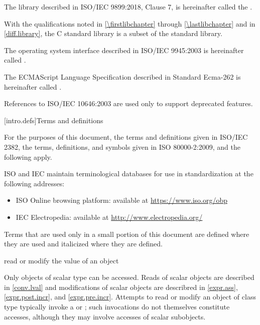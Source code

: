 \pnum
The library described in ISO/IEC 9899:2018, Clause 7,
is hereinafter called the
.
\begin{footnote}
With the qualifications noted in \ref{\firstlibchapter}
through \ref{\lastlibchapter} and in \ref{diff.library}, the C standard
library is a subset of the \Cpp{} standard library.
\end{footnote}

\pnum
The operating system interface described in ISO/IEC 9945:2003 is
hereinafter called .

\pnum
The ECMAScript Language Specification described in Standard Ecma-262 is
hereinafter called .

\pnum
\begin{note}
References to ISO/IEC 10646:2003 are used only
to support deprecated features.
\end{note}

[intro.defs]{Terms and definitions}

\pnum
{}%
For the purposes of this document,
the terms and definitions
given in ISO/IEC 2382,
the terms, definitions, and symbols
given in ISO 80000-2:2009,
and the following apply.

\pnum
ISO and IEC maintain terminological databases
for use in standardization
at the following addresses:
\begin{itemize}
\item ISO Online browsing platform: available at \url{https://www.iso.org/obp}
\item IEC Electropedia: available at \url{http://www.electropedia.org/}
\end{itemize}

\pnum
Terms that are used only in a small portion of this document
are defined where they are used and italicized where they are
defined.

%
read or modify the value of an object

\begin{defnote}
Only objects of scalar type can be accessed.
Reads of scalar objects are described in \ref{conv.lval} and
modifications of scalar objects are describred in
\ref{expr.ass}, \ref{expr.post.incr}, and \ref{expr.pre.incr}.
Attempts to read or modify an object of class type
typically invoke a 
or ;
such invocations do not themselves constitute accesses,
although they may involve accesses of scalar subobjects.
\end{defnote}

